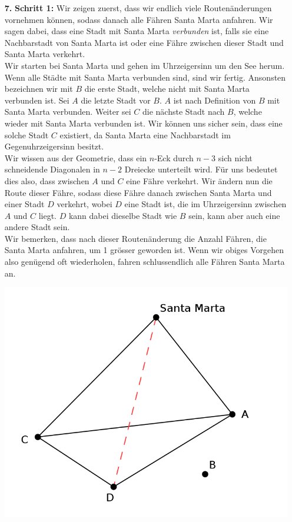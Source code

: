 \documentclass[12pt,a4paper]{article}
\theoremstyle{plain}
\theoremstyle{definition}
\begin{document}
\begin{itemize}
\item[\textbf{7.}]
\textbf{Schritt 1:} Wir zeigen zuerst, dass wir endlich viele Routenänderungen vornehmen können, sodass danach alle Fähren Santa Marta anfahren. Wir sagen dabei, dass eine Stadt mit Santa Marta \textit{verbunden} ist, falls sie eine Nachbarstadt von Santa Marta ist oder eine Fähre zwischen dieser Stadt und Santa Marta verkehrt.\\
Wir starten bei Santa Marta und gehen im Uhrzeigersinn um den See herum. Wenn alle Städte mit Santa Marta verbunden sind, sind wir fertig. Ansonsten bezeichnen wir mit $B$ die erste Stadt, welche nicht mit Santa Marta verbunden ist. Sei $A$ die letzte Stadt vor $B$. $A$ ist nach Definition von $B$ mit Santa Marta verbunden. Weiter sei $C$ die nächste Stadt nach $B$, welche wieder mit Santa Marta verbunden ist. Wir können uns sicher sein, dass eine solche Stadt $C$ existiert, da Santa Marta eine Nachbarstadt im Gegenuhrzeigersinn besitzt.\\
Wir wissen aus der Geometrie, dass ein $n$-Eck durch $n-3$ sich nicht schneidende Diagonalen in $n-2$ Dreiecke unterteilt wird. Für uns bedeutet dies also, dass zwischen $A$ und $C$ eine Fähre verkehrt. Wir ändern nun die Route dieser Fähre, sodass diese Fähre danach zwischen Santa Marta und einer Stadt $D$ verkehrt, wobei $D$ eine Stadt ist, die im Uhrzeigersinn zwischen $A$ und $C$ liegt. $D$ kann dabei dieselbe Stadt wie $B$ sein, kann aber auch eine andere Stadt sein.\\
Wir bemerken, dass nach dieser Routenänderung die Anzahl Fähren, die Santa Marta anfahren, um 1 grösser geworden ist. Wenn wir obiges Vorgehen also genügend oft wiederholen, fahren schlussendlich alle Fähren Santa Marta an.\\
\begin{center}\includegraphics{Finalrunde14_7-1.png}\end{center}

\end{itemize}
\end{document}
